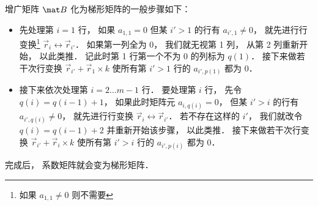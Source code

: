 增广矩阵 $\mat B$ 化为梯形矩阵的一般步骤如下：
\begin{itemize}
\item 先处理第 $i = 1$ 行， 如果 $a_{1,1} = 0$ 但某 $i' > 1$ 的行有 $a_{i', 1} \ne 0$， 就先进行行变换\footnote{如果 $a_{1,1} \ne 0$ 则不需要} $\vec r_i \leftrightarrow \vec r_{i'}$． 如果第一列全为 0， 我们就无视第  1 列， 从第 2 列重新开始， 以此类推． 记此时第 1 行第一个不为 0 的列标为 $q(1)$． 接下来做若干次行变换 $\vec r_{i'} + \vec r_1 \times k$ 使所有第 $i' > 1$ 行的 $a_{i', p(1)}$ 都为 0．

\item 接下来依次处理第 $i = 2\dots m-1$ 行． 要处理第 $i$ 行， 先令 $q(i) = q(i-1)+1$， 如果此时矩阵元 $a_{i, q(i)} = 0$， 但某 $i' > i$ 的行有 $a_{i', q(i)} \ne 0$， 就先进行行变换 $\vec r_i \leftrightarrow \vec r_{i'}$． 若不存在这样的 $i'$， 我们就改令 $q(i) = q(i-1) + 2$ 并重新开始该步骤， 以此类推． 接下来做若干次行变换 $\vec r_{i'} + \vec r_i \times k$ 使所有第 $i' > i$ 行的 $a_{i', p(i)}$ 都为 0．
\end{itemize}
完成后， 系数矩阵就会变为梯形矩阵．

